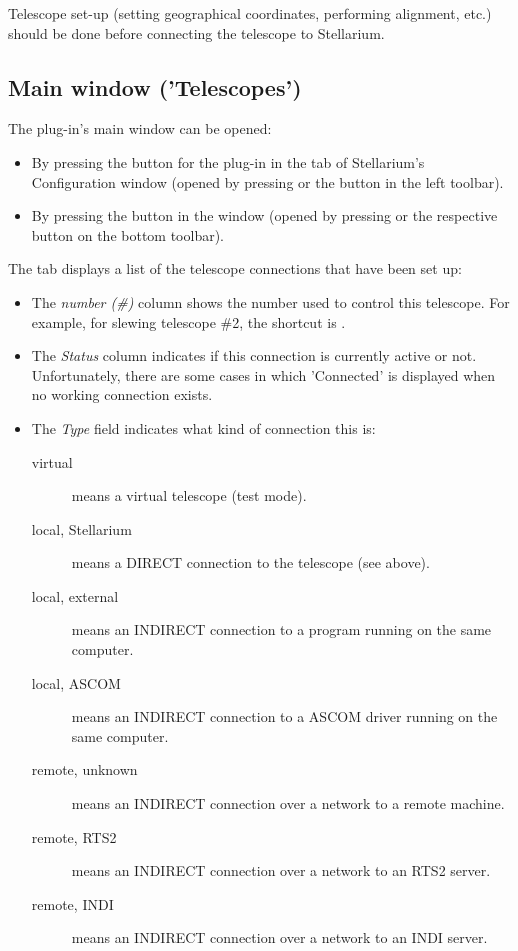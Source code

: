 Telescope set-up (setting geographical coordinates, performing
alignment, etc.) should be done before connecting the telescope to
Stellarium.

\subsection{Main window ('Telescopes')}

The plug-in's main window can be opened:
\begin{itemize}
\item By pressing the  button for the plug-in in the
   tab of Stellarium's Configuration window (opened by
  pressing  or the  button in the left toolbar).
\item By pressing the  button in the 
  window (opened by pressing  or the respective button on the
  bottom toolbar).
\end{itemize}

\noindent The  tab displays a list of the telescope connections that have been set up:

\begin{itemize}
\item The \emph{number (\#)} column shows the number used to control this
  telescope. For example, for slewing telescope \#2, the shortcut is
  .
\item The \emph{Status} column indicates if this connection is
  currently active or not. Unfortunately, there are some cases in
  which 'Connected' is displayed when no working connection exists.
\item The \emph{Type} field indicates what kind of connection this is:
  \begin{description}
  \item[virtual] means a virtual telescope (test mode).
  \item[local, Stellarium] means a DIRECT connection to the telescope (see above).
  \item[local, external] means an INDIRECT connection to a program running on the same computer.
  \item[local, ASCOM] means an INDIRECT connection to a ASCOM driver running on the same computer.
  \item[remote, unknown] means an INDIRECT connection over a network to a remote machine.
  \item[remote, RTS2] means an INDIRECT connection over a network to an RTS2 server.
  \item[remote, INDI] means an INDIRECT connection over a network to an INDI server.
  \end{description}
\end{itemize}

